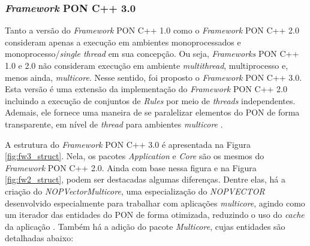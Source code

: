 \FloatBarrier

\subsubsection{\textit{Framework} PON C++ 3.0}\label{sec:fw3}

Tanto a versão do \textit{Framework} PON C++ 1.0 como o \textit{Framework} PON
C++ 2.0 consideram apenas a execução em ambientes monoprocessados e
monoprocesso/\textit{single thread} em sua concepção. Ou seja, \textit{Frameworks}
PON C++ 1.0 e 2.0 não consideram execução em ambiente \textit{multithread},
multiprocesso e, menos ainda, \textit{multicore}. Nesse sentido, foi proposto o
\textit{Framework} PON C++ 3.0. Esta versão é uma extensão da implementação do
\textit{Framework} PON C++ 2.0 incluindo a execução de conjuntos de
\textit{Rules} por meio de \textit{threads} independentes. Ademais, ele fornece
uma maneira de se paralelizar elementos do PON de forma transparente, em nível
de \textit{thread} para ambientes \textit{multicore} \cite{belmonte_2012}.

A estrutura do \textit{Framework} PON C++ 3.0 é apresentada na Figura
\ref{fig:fw3_struct}. Nela, os pacotes \textit{Application} e \textit{Core} são
os mesmos do \textit{Framework} PON C++ 2.0. Ainda com base nessa figura e na
Figura \ref{fig:fw2_struct}, podem ser destacadas algumas diferenças. Dentre
elas, há a criação do \textit{NOPVectorMulticore}, uma especialização do
\textit{NOPVECTOR} desenvolvido especialmente para trabalhar com aplicações
\textit{multicore}, agindo como um iterador das entidades do PON de forma
otimizada, reduzindo o uso do \textit{cache} da aplicação
\cite{belmonte_2012,schutz_2018}. Também há a adição do pacote
\textit{Multicore}, cujas entidades são detalhadas abaixo:

